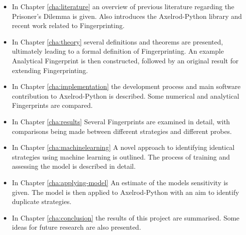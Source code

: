 \begin{itemize}
    \item In Chapter \ref{cha:literature} an overview of previous literature regarding the Prisoner's Dilemma is given.
    Also introduces the Axelrod-Python library and recent work related to Fingerprinting.
    \item In Chapter \ref{cha:theory} several definitions and theorems are presented, ultimately leading to a formal definition of Fingerprinting.
    An example Analytical Fingerprint is then constructed, followed by an original result for extending Fingerprinting.
    \item In Chapter \ref{cha:implementation} the development process and main software contribution to Axelrod-Python is described.
    Some numerical and analytical Fingerprints are compared.
    \item In Chapter \ref{cha:results} Several Fingerprints are examined in detail, with comparisons being made between different strategies and different probes.
    \item In Chapter \ref{cha:machinelearning} A novel approach to identifying identical strategies using machine learning is outlined. The process of training and assessing the model is described in detail.
    \item In Chapter \ref{cha:applying-model} An estimate of the models sensitivity is given.
    The model is then applied to Axelrod-Python with an aim to identify duplicate strategies.
    \item In Chapter \ref{cha:conclusion} the results of this project are summarised. Some ideas for future research are also presented.
\end{itemize}

